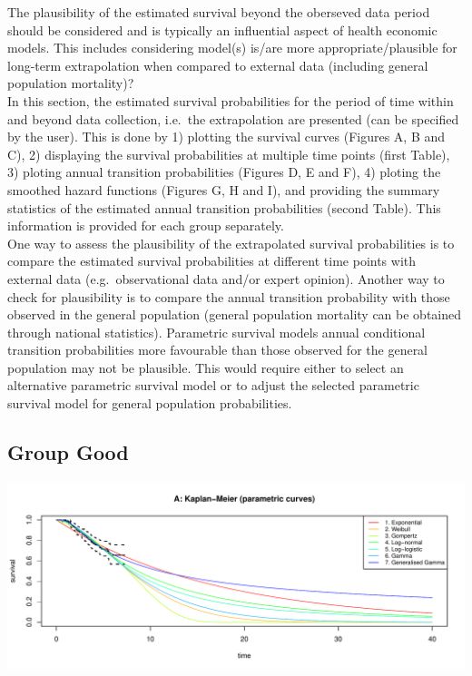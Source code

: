 \documentclass[
]{article}
\begin{document}
The plausibility of the estimated survival beyond the oberseved data
period should be considered and is typically an influential aspect of
health economic models. This includes considering model(s) is/are more
appropriate/plausible for long-term extrapolation when compared to
external data (including general population mortality)?\\
In this section, the estimated survival probabilities for the period of
time within and beyond data collection, i.e.~the extrapolation are
presented (can be specified by the user). This is done by 1) plotting
the survival curves (Figures A, B and C), 2) displaying the survival
probabilities at multiple time points (first Table), 3) ploting annual
transition probabilities (Figures D, E and F), 4) ploting the smoothed
hazard functions (Figures G, H and I), and providing the summary
statistics of the estimated annual transition probabilities (second
Table). This information is provided for each group separately.\\
One way to assess the plausibility of the extrapolated survival
probabilities is to compare the estimated survival probabilities at
different time points with external data (e.g.~observational data and/or
expert opinion). Another way to check for plausibility is to compare the
annual transition probability with those observed in the general
population (general population mortality can be obtained through
national statistics). Parametric survival models annual conditional
transition probabilities more favourable than those observed for the
general population may not be plausible. This would require either to
select an alternative parametric survival model or to adjust the
selected parametric survival model for general population probabilities.

\clearpage

\hypertarget{group-good}{%
\subsection{Group Good}\label{group-good}}

\begin{flushleft}\includegraphics[height=0.29\textheight]{Images/validate_extrapolation1-1} \end{flushleft}
\end{document}
